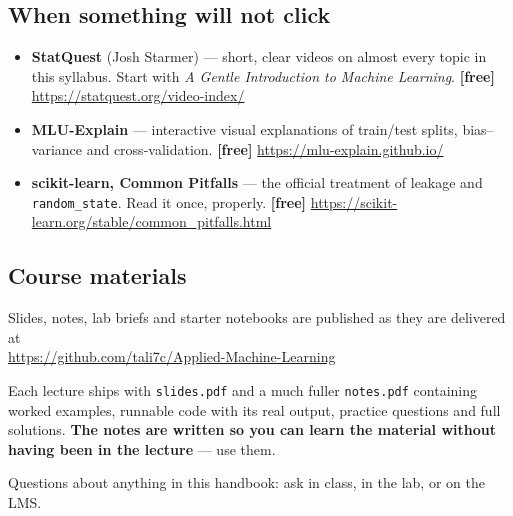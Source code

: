 \documentclass[11pt]{article}
\begin{document}
\subsection*{When something will not click}

\begin{itemize}[leftmargin=*]
  \item \textbf{StatQuest} (Josh Starmer) --- short, clear videos on almost every
    topic in this syllabus. Start with \emph{A Gentle Introduction to Machine
    Learning}. \textbf{[free]} \url{https://statquest.org/video-index/}
  \item \textbf{MLU-Explain} --- interactive visual explanations of train/test
    splits, bias--variance and cross-validation. \textbf{[free]}
    \url{https://mlu-explain.github.io/}
  \item \textbf{scikit-learn, Common Pitfalls} --- the official treatment of
    leakage and \texttt{random\_state}. Read it once, properly. \textbf{[free]}
    \url{https://scikit-learn.org/stable/common_pitfalls.html}
\end{itemize}

\subsection*{Course materials}

Slides, notes, lab briefs and starter notebooks are published as they are
delivered at\\
\url{https://github.com/tali7c/Applied-Machine-Learning}

Each lecture ships with \texttt{slides.pdf} and a much fuller \texttt{notes.pdf}
containing worked examples, runnable code with its real output, practice
questions and full solutions. \textbf{The notes are written so you can learn the
material without having been in the lecture} --- use them.

\vfill
\begin{center}
\small Questions about anything in this handbook: ask in class, in the lab, or
on the LMS.
\end{center}
\end{document}
